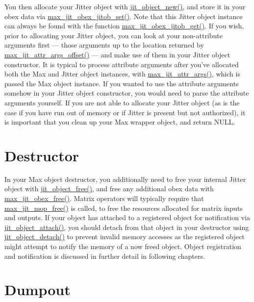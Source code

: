 You then allocate your Jitter object with \hyperlink{group__objectmod_gabde2eb49750992ec4125af862b402342}{jit\_\-object\_\-new()}, and store it in your obex data via \hyperlink{group__maxwrapmod_gaa1b174cf92680ca46bfb189a812d2a65}{max\_\-jit\_\-obex\_\-jitob\_\-set()}. Note that this Jitter object instance can always be found with the function \hyperlink{group__maxwrapmod_ga063ab88bfc92c1a666f3ad6251834e20}{max\_\-jit\_\-obex\_\-jitob\_\-get()}. If you wish, prior to allocating your Jitter object, you can look at your non-\/attribute arguments first — those arguments up to the location returned by \hyperlink{group__maxwrapmod_ga1a28ddf72d9bdcb2096df36384b63de6}{max\_\-jit\_\-attr\_\-args\_\-offset()} — and make use of them in your Jitter object constructor. It is typical to process attribute arguments after you've allocated both the Max and Jitter object instances, with \hyperlink{group__maxwrapmod_gac1ffd4864421154c8e6364b5df9a09ff}{max\_\-jit\_\-attr\_\-args()}, which is passed the Max object instance. If you wanted to use the attribute arguments somehow in your Jitter object constructor, you would need to parse the attribute arguments yourself. If you are not able to allocate your Jitter object (as is the case if you have run out of memory or if Jitter is present but not authorized), it is important that you clean up your Max wrapper object, and return NULL.\hypertarget{chapter_jit_maxwrappers_chapter_jit_maxwrappers_dtor}{}\section{Destructor}\label{chapter_jit_maxwrappers_chapter_jit_maxwrappers_dtor}
In your Max object destructor, you additionally need to free your internal Jitter object with \hyperlink{group__objectmod_ga64970b62e5afe7a2cbd57efd6e9e9f74}{jit\_\-object\_\-free()}, and free any additional obex data with \hyperlink{group__maxwrapmod_gabcf9c466a6baa22994a66e30b54e7dd6}{max\_\-jit\_\-obex\_\-free()}. Matrix operators will typically require that \hyperlink{group__maxmopmod_ga441ff70d705e1eccff8297437c85e46c}{max\_\-jit\_\-mop\_\-free()} is called, to free the resources allocated for matrix inputs and outputs. If your object has attached to a registered object for notification via \hyperlink{group__objectmod_ga213166e8beeb29aca36c57cd07c722f1}{jit\_\-object\_\-attach()}, you should detach from that object in your destructor using \hyperlink{group__objectmod_gaa286218b643371fe28cbe261facd5b21}{jit\_\-object\_\-detach()} to prevent invalid memory accesses as the registered object might attempt to notify the memory of a now freed object. Object registration and notification is discussed in further detail in following chapters.\hypertarget{chapter_jit_maxwrappers_chapter_jit_maxwrappers_dumpout}{}\section{Dumpout}\label{chapter_jit_maxwrappers_chapter_jit_maxwrappers_dumpout}
